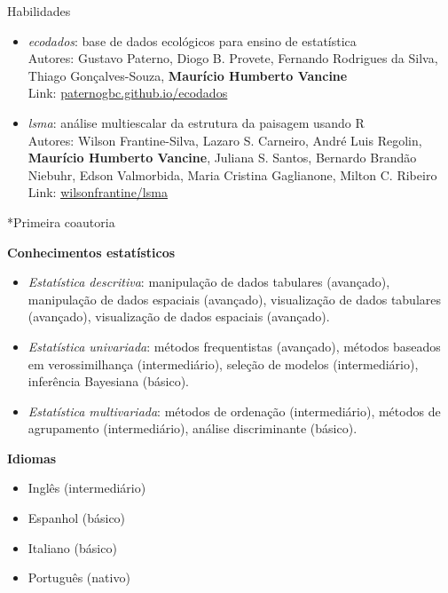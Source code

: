 \documentclass{resume}
\begin{document}
\begin{rSection}{Habilidades}
\begin{itemize}
\item {\it ecodados}: base de dados ecológicos para ensino de estatística\\
Autores: Gustavo Paterno, Diogo B. Provete, Fernando Rodrigues da Silva, Thiago Gonçalves-Souza, {\bf Maurício Humberto Vancine}\\
Link: \href{https://paternogbc.github.io/ecodados/}{\underline{paternogbc.github.io/ecodados}}

\item {\it lsma}: análise multiescalar da estrutura da paisagem usando R\\
Autores: Wilson Frantine-Silva, Lazaro S. Carneiro, André Luis Regolin, {\bf Maurício Humberto Vancine}, Juliana S. Santos, Bernardo Brandão Niebuhr, Edson Valmorbida, Maria Cristina Gaglianone, Milton C. Ribeiro\\
Link: \href{https://github.com/wilsonfrantine/landscapeDecoupler}{\underline{wilsonfrantine/lsma}}
\end{itemize} 

*Primeira coautoria

{\bf Conhecimentos estatísticos}
\begin{itemize} 
\item {\it Estatística descritiva}: manipulação de dados tabulares (avançado), manipulação de dados espaciais (avançado), visualização de dados tabulares (avançado), visualização de dados espaciais (avançado).

\item {\it Estatística univariada}: métodos frequentistas (avançado), métodos baseados em verossimilhança (intermediário), seleção de modelos (intermediário), inferência Bayesiana (básico).

\item {\it Estatística multivariada}: métodos de ordenação (intermediário), métodos de agrupamento (intermediário), análise discriminante (básico).
\end{itemize}

{\bf Idiomas}
\begin{itemize}
\item Inglês (intermediário)
\item Espanhol (básico)
\item Italiano (básico)
\item Português (nativo)
\end{itemize}

\end{rSection}


\end{document}
